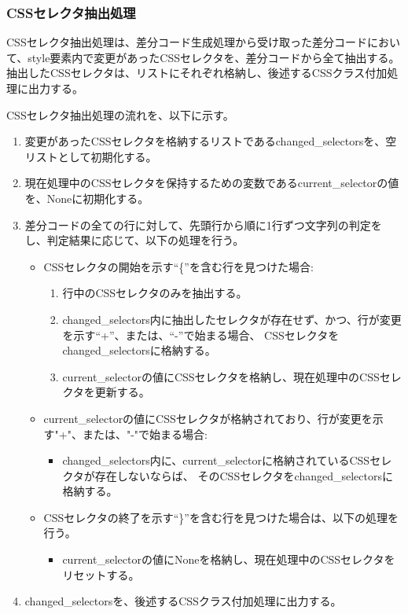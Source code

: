 \subsubsection{CSSセレクタ抽出処理}\label{subsubsec: style_analysis}
CSSセレクタ抽出処理は、差分コード生成処理から受け取った差分コードにおいて、style要素内で変更があったCSSセレクタ\cite{CssSelector}を、差分コードから全て抽出する。
抽出したCSSセレクタは、リストにそれぞれ格納し、後述するCSSクラス付加処理に出力する。
\par
CSSセレクタ抽出処理の流れを、以下に示す。
\begin{enumerate}
    \item 変更があったCSSセレクタを格納するリストであるchanged\_selectorsを、空リストとして初期化する。
    \item 現在処理中のCSSセレクタを保持するための変数であるcurrent\_selectorの値を、Noneに初期化する。
    \item 差分コードの全ての行に対して、先頭行から順に1行ずつ文字列の判定をし、判定結果に応じて、以下の処理を行う。
          \begin{itemize}
              \item CSSセレクタの開始を示す“\{”を含む行を見つけた場合:
                    \begin{enumerate}
                        \item 行中のCSSセレクタのみを抽出する。
                        \item changed\_selectors内に抽出したセレクタが存在せず、かつ、行が変更を示す“+”、または、“-”で始まる場合、
                              CSSセレクタをchanged\_selectorsに格納する。
                        \item current\_selectorの値にCSSセレクタを格納し、現在処理中のCSSセレクタを更新する。
                    \end{enumerate}
              \item current\_selectorの値にCSSセレクタが格納されており、行が変更を示す"+"、または、"-"で始まる場合:
                    \begin{itemize}
                        \item changed\_selectors内に、current\_selectorに格納されているCSSセレクタが存在しないならば、
                              そのCSSセレクタをchanged\_selectorsに格納する。
                    \end{itemize}
              \item CSSセレクタの終了を示す“\}”を含む行を見つけた場合は、以下の処理を行う。
                    \begin{itemize}
                        \item current\_selectorの値にNoneを格納し、現在処理中のCSSセレクタをリセットする。
                    \end{itemize}
          \end{itemize}
    \item changed\_selectorsを、後述するCSSクラス付加処理に出力する。
\end{enumerate}

